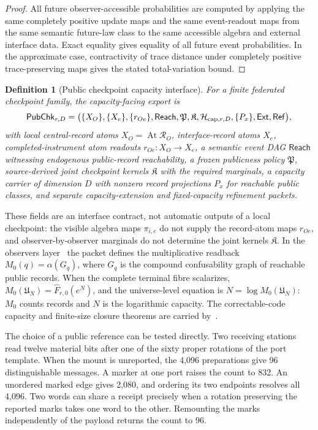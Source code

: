 \documentclass[11pt]{article}
\newtheorem{definition}[theorem]{Definition}
\theoremstyle{remark}
\theoremstyle{plain}
\begin{document}
\begin{proof}
All future observer-accessible probabilities are computed by applying the same completely
positive update maps and the same event-readout maps from the same semantic future-law class to the
same accessible algebra and external interface data. Exact equality gives equality of all future event probabilities. In the
approximate case, contractivity of trace distance under completely positive trace-preserving maps
gives the stated total-variation bound.
\end{proof}

\begin{definition}[Public checkpoint capacity interface]
\label{def:public-checkpoint-capacity-interface}
For a finite federated checkpoint family, the capacity-facing export is
\[
\mathsf{PubChk}_{r,D}=
\bigl(
\{X_O\},\{X_e\},\{r_{Oe}\},
\mathsf{Reach},\mathfrak P,\mathfrak K,
\mathcal H_{{\rm cap},r,D},\{P_x\},
\mathsf{Ext},\mathsf{Ref}
\bigr),
\]
with local central-record atoms \(X_O=\operatorname{At}\mathcal R_O\),
interface-record atoms \(X_e\), completed-instrument atom readouts
\(r_{Oe}:X_O\to X_e\), a semantic event DAG \(\mathsf{Reach}\) witnessing
endogenous public-record reachability, a frozen publicness policy
\(\mathfrak P\), source-derived joint checkpoint kernels \(\mathfrak K\) with
the required marginals, a capacity carrier of dimension \(D\) with nonzero
record projections \(P_x\) for reachable public classes, and separate
capacity-extension and fixed-capacity refinement packets.
\end{definition}

These fields are an interface contract, not automatic outputs of a local
checkpoint: the visible algebra maps \(\pi_{i,e}\) do not supply the
record-atom maps \(r_{Oe}\), and observer-by-observer marginals do not
determine the joint kernels \(\mathfrak K\). In the observers
layer~\cite{ophobservers} the packet defines the multiplicative readback
\(M_0(q)=\alpha(G_q)\), where \(G_q\) is the compound confusability graph of
reachable public records. When the complete terminal fibre scalarizes,
\(M_0(\mathfrak U_N)=\widehat F_{r,0}(e^N)\), and the universe-level equation
is \(N=\log M_0(\mathfrak U_N)\): \(M_0\) counts records and \(N\) is the
logarithmic capacity. The correctable-code capacity and finite-size closure
theorems are carried by~\cite{ophsynthesis}.

The choice of a public reference can be tested directly. Two receiving
stations read twelve material bits after one of the sixty proper
rotations of the port template. When the mount is unreported, the
4,096 preparations give 96 distinguishable messages. A marker at one
port raises the count to 832. An unordered marked edge gives 2,080,
and ordering its two endpoints resolves all 4,096. Two words can share
a receipt precisely when a rotation preserving the reported marks takes
one word to the other. Remounting the marks independently of the payload
returns the count to 96.
\end{document}

